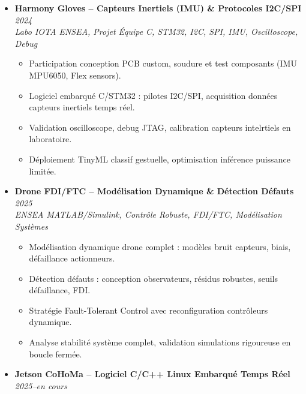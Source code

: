 \documentclass[a4paper,11pt]{article}
\begin{document}
\begin{itemize}[leftmargin=*, label={-}]
    \vspace{3pt}
    \item \textbf{Harmony Gloves -- Capteurs Inertiels (IMU) \& Protocoles I2C/SPI} \hfill \textit{2024} \\
    \textit{Labo IOTA ENSEA, Projet \'Equipe} \hfill \textit{C, STM32, I2C, SPI, IMU, Oscilloscope, Debug}
    \vspace{-2pt}
        \begin{itemize}[leftmargin=0.4cm, nosep, label=\tiny$\bullet$]
            \item \small{Participation conception PCB custom, soudure et test composants (IMU MPU6050, Flex sensors).}
            \item \small{Logiciel embarqu\'e C/STM32 : pilotes I2C/SPI, acquisition donn\'ees capteurs inertiels temps r\'eel.}
            \item \small{Validation oscilloscope, debug JTAG, calibration capteurs intelrtiels en laboratoire.}
            \item \small{D\'eploiement TinyML classif gestuelle, optimisation inférence puissance limit\'ee.}
        \end{itemize}
    \vspace{3pt}
    \item \textbf{Drone FDI/FTC -- Modélisation Dynamique \& D\'etection Défauts} \hfill \textit{2025} \\
    \textit{ENSEA} \hfill \textit{MATLAB/Simulink, Contr\^ole Robuste, FDI/FTC, Mod\'elisation Syst\`emes}
    \vspace{-2pt}
        \begin{itemize}[leftmargin=0.4cm, nosep, label=\tiny$\bullet$]
            \item \small{Modélisation dynamique drone complet : mod\`eles bruit capteurs, biais, d\'efaillance actionneurs.}
            \item \small{D\'etection défauts : conception observateurs, r\'esidus robustes, seuils d\'efaillance, FDI.}
            \item \small{Strat\'egie Fault-Tolerant Control avec reconfiguration contr\^oleurs dynamique.}
            \item \small{Analyse stabilit\'e syst\`eme complet, validation simulations rigoureuse en boucle fermée.}
        \end{itemize}
    \vspace{3pt}
    \item \textbf{Jetson CoHoMa -- Logiciel C/C++ Linux Embarqu\'e Temps R\'eel} \hfill \textit{2025--en cours} \\

\end{itemize}
\end{document}
